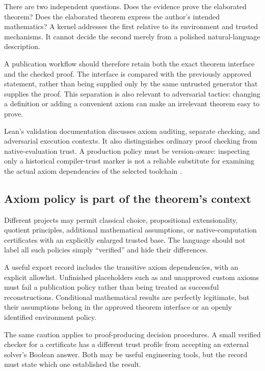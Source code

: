 \documentclass[11pt,a4paper]{article}
\newcommand{\code}[1]{\texttt{\detokenize{#1}}}
\theoremstyle{remark}
\begin{document}
There are two independent questions. Does the evidence prove the elaborated theorem? Does the elaborated theorem express the author's intended mathematics? A kernel addresses the first relative to its environment and trusted mechanisms. It cannot decide the second merely from a polished natural-language description.

A publication workflow should therefore retain both the exact theorem interface and the checked proof. The interface is compared with the previously approved statement, rather than being supplied only by the same untrusted generator that supplies the proof. This separation is also relevant to adversarial tactics: changing a definition or adding a convenient axiom can make an irrelevant theorem easy to prove.

Lean's validation documentation discusses axiom auditing, separate checking, and adversarial execution contexts. It also distinguishes ordinary proof checking from native-evaluation trust. A production policy must be version-aware: inspecting only a historical compiler-trust marker is not a reliable substitute for examining the actual axiom dependencies of the selected toolchain \cite{lean-validation}.

\subsection{Axiom policy is part of the theorem's context}

Different projects may permit classical choice, propositional extensionality, quotient principles, additional mathematical assumptions, or native-computation certificates with an explicitly enlarged trusted base. The language should not label all such policies simply ``verified'' and hide their differences.

A useful export record includes the transitive axiom dependencies, with an explicit allowlist. Unfinished placeholders such as \code{sorry} and unapproved custom axioms must fail a publication policy rather than being treated as successful reconstructions. Conditional mathematical results are perfectly legitimate, but their assumptions belong in the approved theorem interface or an openly identified environment policy.

The same caution applies to proof-producing decision procedures. A small verified checker for a certificate has a different trust profile from accepting an external solver's Boolean answer. Both may be useful engineering tools, but the record must state which one established the result.
\end{document}
